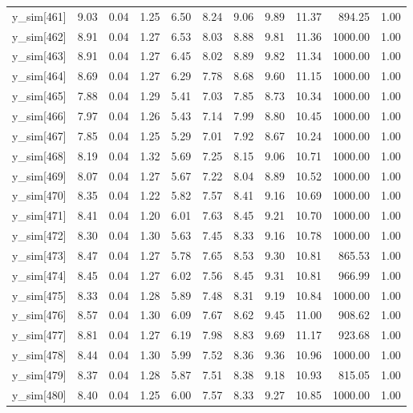 \begin{table}[ht]
\begin{tabular}{rrrrrrrrrrr}
  y\_sim[461] & 9.03 & 0.04 & 1.25 & 6.50 & 8.24 & 9.06 & 9.89 & 11.37 & 894.25 & 1.00 \\ 
  y\_sim[462] & 8.91 & 0.04 & 1.27 & 6.53 & 8.03 & 8.88 & 9.81 & 11.36 & 1000.00 & 1.00 \\ 
  y\_sim[463] & 8.91 & 0.04 & 1.27 & 6.45 & 8.02 & 8.89 & 9.82 & 11.34 & 1000.00 & 1.00 \\ 
  y\_sim[464] & 8.69 & 0.04 & 1.27 & 6.29 & 7.78 & 8.68 & 9.60 & 11.15 & 1000.00 & 1.00 \\ 
  y\_sim[465] & 7.88 & 0.04 & 1.29 & 5.41 & 7.03 & 7.85 & 8.73 & 10.34 & 1000.00 & 1.00 \\ 
  y\_sim[466] & 7.97 & 0.04 & 1.26 & 5.43 & 7.14 & 7.99 & 8.80 & 10.45 & 1000.00 & 1.00 \\ 
  y\_sim[467] & 7.85 & 0.04 & 1.25 & 5.29 & 7.01 & 7.92 & 8.67 & 10.24 & 1000.00 & 1.00 \\ 
  y\_sim[468] & 8.19 & 0.04 & 1.32 & 5.69 & 7.25 & 8.15 & 9.06 & 10.71 & 1000.00 & 1.00 \\ 
  y\_sim[469] & 8.07 & 0.04 & 1.27 & 5.67 & 7.22 & 8.04 & 8.89 & 10.52 & 1000.00 & 1.00 \\ 
  y\_sim[470] & 8.35 & 0.04 & 1.22 & 5.82 & 7.57 & 8.41 & 9.16 & 10.69 & 1000.00 & 1.00 \\ 
  y\_sim[471] & 8.41 & 0.04 & 1.20 & 6.01 & 7.63 & 8.45 & 9.21 & 10.70 & 1000.00 & 1.00 \\ 
  y\_sim[472] & 8.30 & 0.04 & 1.30 & 5.63 & 7.45 & 8.33 & 9.16 & 10.78 & 1000.00 & 1.00 \\ 
  y\_sim[473] & 8.47 & 0.04 & 1.27 & 5.78 & 7.65 & 8.53 & 9.30 & 10.81 & 865.53 & 1.00 \\ 
  y\_sim[474] & 8.45 & 0.04 & 1.27 & 6.02 & 7.56 & 8.45 & 9.31 & 10.81 & 966.99 & 1.00 \\ 
  y\_sim[475] & 8.33 & 0.04 & 1.28 & 5.89 & 7.48 & 8.31 & 9.19 & 10.84 & 1000.00 & 1.00 \\ 
  y\_sim[476] & 8.57 & 0.04 & 1.30 & 6.09 & 7.67 & 8.62 & 9.45 & 11.00 & 908.62 & 1.00 \\ 
  y\_sim[477] & 8.81 & 0.04 & 1.27 & 6.19 & 7.98 & 8.83 & 9.69 & 11.17 & 923.68 & 1.00 \\ 
  y\_sim[478] & 8.44 & 0.04 & 1.30 & 5.99 & 7.52 & 8.36 & 9.36 & 10.96 & 1000.00 & 1.00 \\ 
  y\_sim[479] & 8.37 & 0.04 & 1.28 & 5.87 & 7.51 & 8.38 & 9.18 & 10.93 & 815.05 & 1.00 \\ 
  y\_sim[480] & 8.40 & 0.04 & 1.25 & 6.00 & 7.57 & 8.33 & 9.27 & 10.85 & 1000.00 & 1.00 \\ 

\end{tabular}
\end{table}
